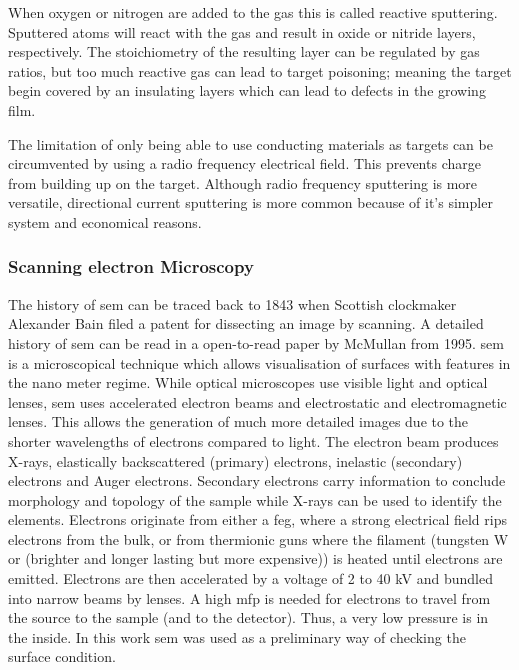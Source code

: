 When oxygen or nitrogen are added to the gas this is called reactive sputtering.
Sputtered atoms will react with the gas and result in oxide or nitride layers, respectively.
The stoichiometry of the resulting layer can be regulated by gas ratios, but too much reactive gas can lead to target poisoning;
meaning the target begin covered by an insulating layers which can lead to defects in the growing film\cite{Kelly2000}. 

The limitation of only being able to use conducting materials as targets can be circumvented by using a radio frequency electrical field. 
This prevents charge from building up on the target. 
Although radio frequency sputtering is more versatile, directional current sputtering is more common because of it's simpler system and economical reasons.

\subsubsection{Scanning electron Microscopy}
The history of \gls{sem} can be traced back to 1843 when Scottish clockmaker Alexander Bain filed a patent for dissecting an image by scanning. A detailed history of \gls{sem} can be read in a open-to-read paper by McMullan from 1995\cite{McMullan1995}. 
\Gls{sem} is a microscopical technique which allows visualisation of surfaces with features in the nano meter regime. 
While optical microscopes use visible light and optical lenses, \gls{sem} uses accelerated electron beams and electrostatic and electromagnetic lenses.
This allows the generation of much more detailed images due to the shorter wavelengths of electrons compared to light\cite{Kaliva2020}.
The electron beam produces X-rays, elastically backscattered (primary) electrons, inelastic (secondary) electrons and Auger electrons. 
Secondary electrons carry information to conclude morphology and topology of the sample while X-rays can be used to identify the elements. 
Electrons originate from either a \gls{feg}, where a strong electrical field rips electrons from the bulk, or from thermionic guns where the filament (tungsten W or  (brighter and longer lasting but more expensive)) is heated until electrons are emitted. 
Electrons are then accelerated by a voltage of 2 to 40 kV and bundled into narrow beams by lenses\cite{Vernon2000}.
A high \gls{mfp} is needed for electrons to travel from the source to the sample (and to the detector). 
Thus, a very low pressure is in the inside. 
In this work \gls{sem} was used as a preliminary way of checking the surface condition. 
\enlargethispage{\baselineskip}


